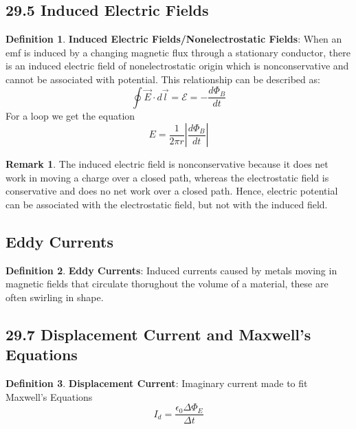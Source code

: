 \documentclass[12pt]{amsart}
\theoremstyle{definition}
\newtheorem{definition}{Definition} %
\newtheorem*{remark}{Remark}        %
\numberwithin{equation}{theorem}    %
\begin{document}
\subsection*{29.5 Induced Electric Fields}
\begin{definition}
    \textbf{Induced Electric Fields/Nonelectrostatic Fields}:
    When an emf is induced by a changing magnetic flux through a stationary conductor, there is an induced electric field of nonelectrostatic origin which is nonconservative and cannot be associated with potential. This relationship can be described as: 
    $$\oint \vec{E} \cdot d\vec{l} = \mathcal{E} = -\frac{d\Phi_B}{dt}$$
    For a loop we get the equation $$E = \frac{1}{2\pi r}{|\frac{d\Phi_B}{dt}|}$$

    \begin{remark}
        The induced electric field is nonconservative because it does net work in moving a charge over a closed path, whereas the electrostatic field is conservative and does no net work over a closed path. Hence, electric potential can be associated with the electrostatic field, but not with the induced field.
    \end{remark}
\end{definition}

\subsection*{Eddy Currents}

\begin{definition}
    \textbf{Eddy Currents}:
    Induced currents caused by metals moving in magnetic fields that circulate thorughout the volume of a material, these are often swirling in shape. 
\end{definition}

\subsection*{29.7 Displacement Current and Maxwell's Equations}

\begin{definition}
    \textbf{Displacement Current}:
    Imaginary current made to fit Maxwell's Equations
    $$I_d = \frac{\epsilon_0 \Delta \Phi_E}{\Delta t}$$
\end{definition}
\end{document}
